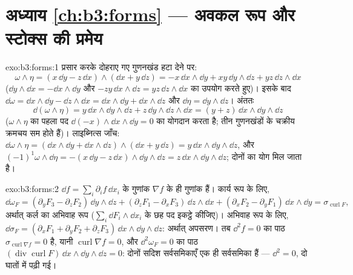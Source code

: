 \section*{अध्याय \ref{ch:b3:forms} --- अवकल रूप और स्टोक्स की
प्रमेय}

\begin{solution}{exo:b3:forms:1}
प्रसार करके दोहराए गए गुणनखंड हटा देने पर:
\[
\omega\wedge\eta = (x\,\dd y - z\,\dd x)\wedge(\dd x +
y\,\dd z)
= -x\,\dd x\wedge\dd y + xy\,\dd y\wedge\dd z +
yz\,\dd z\wedge\dd x
\]
($\dd y\wedge\dd x = -\dd x\wedge\dd y$ और $-zy\,\dd
x\wedge\dd z = yz\,\dd z\wedge\dd x$ का उपयोग करते हुए)। इसके
बाद $\dd\omega =
\dd x\wedge\dd y - \dd z\wedge\dd x = \dd x\wedge\dd y +
\dd x\wedge\dd z$ और $\dd\eta = \dd y\wedge\dd z$। अंततः
\[
\dd(\omega\wedge\eta) = y\,\dd x\wedge\dd y\wedge\dd z +
z\,\dd y\wedge\dd z\wedge\dd x = (y + z)\,\dd x\wedge\dd
y\wedge\dd z
\]
($\omega\wedge\eta$ का पहला पद $\dd(-x)
\wedge\dd x\wedge\dd y = 0$ का योगदान करता है; तीन गुणनखंडों
के चक्रीय क्रमचय सम होते हैं)। लाइब्नित्स जाँच:
$\dd\omega\wedge\eta =
(\dd x\wedge\dd y + \dd x\wedge\dd z)\wedge(\dd x + y\,\dd
z) = y\,\dd x\wedge\dd y\wedge\dd z$, और
$(-1)^1\omega\wedge\dd\eta = -(x\,\dd y - z\,\dd
x)\wedge\dd y\wedge\dd z = z\,\dd x\wedge\dd y\wedge\dd z$;
दोनों का योग मिल जाता है।
\end{solution}

\begin{solution}{exo:b3:forms:2}
$\dd f = \sum_i\partial_if\,\dd x_i$ के गुणांक $\nabla f$ के
ही गुणांक हैं। कार्य रूप के लिए,
\[
\dd\omega_F = (\partial_yF_3 - \partial_zF_2)\,\dd y\wedge\dd
z + (\partial_zF_1 - \partial_xF_3)\,\dd z\wedge\dd x +
(\partial_xF_2 - \partial_yF_1)\,\dd x\wedge\dd y =
\sigma_{\operatorname{curl}F},
\]
अर्थात् कर्ल का अभिवाह रूप ($\sum_i\dd F_i\wedge\dd x_i$ के
छह पद इकट्ठे कीजिए)। अभिवाह रूप के लिए,
$\dd\sigma_F = (\partial_xF_1 + \partial_yF_2 +
\partial_zF_3)\,\dd x\wedge\dd y\wedge\dd z$: अर्थात्
अपसरण। तब $\dd^2f = 0$ का पाठ
$\sigma_{\operatorname{curl}\nabla f} = 0$ है, यानी
$\operatorname{curl}\nabla f = 0$, और $\dd^2\omega_F = 0$
का पाठ $(\operatorname{div}\operatorname{curl}F)\,\dd
x\wedge\dd y\wedge\dd z = 0$: दोनों सदिश सर्वसमिकाएँ एक ही
सर्वसमिका हैं --- $\dd^2 = 0$, दो घातों में पढ़ी गई।
\end{solution}

